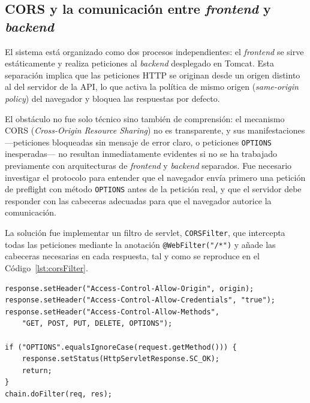     \subsection*{CORS y la comunicación entre \textit{frontend} y \textit{backend}}

El sistema está organizado como dos procesos independientes: el \textit{frontend} se sirve
estáticamente y realiza peticiones al \textit{backend} desplegado en Tomcat. Esta separación
implica que las peticiones HTTP se originan desde un origen distinto al del servidor de la
API, lo que activa la política de mismo origen (\textit{same-origin policy}) del navegador
y bloquea las respuestas por defecto.

El obstáculo no fue solo técnico sino también de comprensión: el mecanismo CORS
(\textit{Cross-Origin Resource Sharing}) no es transparente, y sus manifestaciones
---peticiones bloqueadas sin mensaje de error claro, o peticiones \texttt{OPTIONS}
inesperadas--- no resultan inmediatamente evidentes si no se ha trabajado previamente
con arquitecturas de \textit{frontend} y \textit{backend} separados. Fue necesario investigar el protocolo
para entender que el navegador envía primero una petición de preflight con método
\texttt{OPTIONS} antes de la petición real, y que el servidor debe responder con las
cabeceras adecuadas para que el navegador autorice la comunicación.

La solución fue implementar un filtro de servlet, \texttt{CORSFilter}, que intercepta
todas las peticiones mediante la anotación \texttt{@WebFilter("/*")} y añade las
cabeceras necesarias en cada respuesta, tal y como se reproduce en el
Código~\ref{lst:corsFilter}.

\begin{lstlisting}[style=javaStyle, caption={[Filtro \texttt{CORSFilter}]Filtro \texttt{CORSFilter} para gestionar las cabeceras CORS}, label=lst:corsFilter]
response.setHeader("Access-Control-Allow-Origin", origin);
response.setHeader("Access-Control-Allow-Credentials", "true");
response.setHeader("Access-Control-Allow-Methods",
    "GET, POST, PUT, DELETE, OPTIONS");

if ("OPTIONS".equalsIgnoreCase(request.getMethod())) {
    response.setStatus(HttpServletResponse.SC_OK);
    return;
}
chain.doFilter(req, res);
\end{lstlisting}

